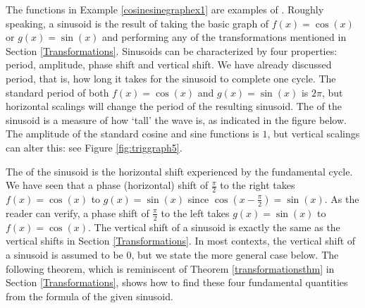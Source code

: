 The functions in Example \ref{cosinesinegraphex1} are examples of . Roughly speaking, a sinusoid is the result of taking the basic graph of $f(x) = \cos(x)$ or $g(x) = \sin(x)$ and performing any of the transformations mentioned in Section \ref{Transformations}.  Sinusoids can be characterized by four properties:  period, amplitude, phase shift and vertical shift. We have already discussed period, that is, how long it takes for the sinusoid to complete one cycle.  The standard period of both $f(x) = \cos(x)$ and $g(x) = \sin(x)$ is $2\pi$, but horizontal scalings will change the period of the resulting sinusoid.  The  of the sinusoid is a measure of how `tall' the wave is, as indicated in the figure below.  The amplitude of the standard cosine and sine functions is $1$, but vertical scalings can alter this: see Figure \ref{fig:triggraph5}.  



The  of the sinusoid is the horizontal shift experienced by the fundamental cycle. We have seen that a phase (horizontal) shift of $\frac{\pi}{2}$ to the right takes $f(x) = \cos(x)$ to $g(x) = \sin(x)$ since $\cos\left(x - \frac{\pi}{2}\right) = \sin(x)$.  As the reader can verify,  a phase shift of $\frac{\pi}{2}$ to the left takes $g(x) = \sin(x)$ to $f(x)= \cos(x)$.   The vertical shift of a sinusoid is exactly the same as the vertical shifts in Section \ref{Transformations}.  In most contexts, the vertical shift of a sinusoid is assumed to be $0$, but we state the more general case below.  The following theorem, which is reminiscent of Theorem \ref{transformationsthm} in Section \ref{Transformations}, shows how to find these four fundamental quantities from the formula of the given sinusoid.

\smallskip


